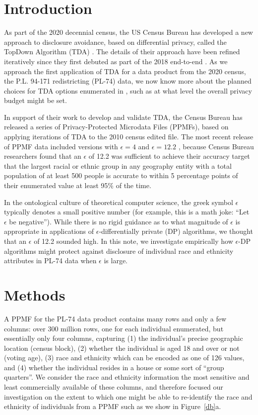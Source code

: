 \documentclass{article}
\begin{document}
\section{Introduction}
\label{introduction}
As part of the 2020 decennial census, the US Census Bureau has developed a new approach to disclosure avoidance, based on differential privacy, called the TopDown Algorithm (TDA) \cite{abowd2019census}.  The details of their approach have been refined iteratively since they first debuted as part of the 2018 end-to-end  \cite{garfinkel2019end}.  As we approach the first application of TDA for a data product from the 2020 census, the P.L. 94-171 redistricting (PL-74) data, we now know more about the planned choices for TDA options enumerated in \cite{petti2019differential}, such as at what level the overall privacy budget might be set.

In support of their work to develop and validate TDA,  the Census Bureau has released a series of Privacy-Protected Microdata Files (PPMFs), based on applying iterations of TDA to the 2010 census edited file.  The most recent release of PPMF data included versions with $\epsilon=4$ and $\epsilon=12.2$ \cite{census2021developing}, because
Census Bureau researchers found that an $\epsilon$ of 12.2 was sufficient to achieve their accuracy target that the largest racial or ethnic group in any geography entity with a total population of at least 500 people is accurate to within 5 percentage points of their enumerated value at least 95\% of the time.

In the ontological culture of theoretical computer science, the greek symbol $\epsilon$ typically denotes a small positive number (for example, this is a math joke: ``Let $\epsilon$ be negative'').  While there is no rigid guidance as to what magnitude of $\epsilon$ is appropriate in applications of $\epsilon$-differentially private (DP) algorithms, we thought that an $\epsilon$ of 12.2 sounded high. In this note, we investigate empirically how $\epsilon$-DP algorithms might protect against disclosure of individual race and ethnicity attributes in PL-74 data when $\epsilon$ is large.

\section{Methods}
A PPMF for the PL-74 data product contains many rows and only a few columns: over 300 million rows, one for each individual enumerated, but essentially only four columns, capturing (1) the individual's precise geographic location (census block), (2) whether the individual is aged 18 and over or not (voting age), (3) race and ethnicity which can be encoded as one of 126 values, and (4) whether the individual resides in a house or some sort of ``group quarters''.  We consider the race and ethnicity information the most sensitive and least commercially available of these columns, and therefore focused our investigation on the extent to which one might be able to re-identify the race and ethnicity of individuals from a PPMF such as we show in Figure~\ref{db}a.
\end{document}
